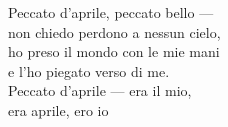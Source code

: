 \begin{lyrics}
Peccato d'aprile, peccato bello —\\
non chiedo perdono a nessun cielo,\\
ho preso il mondo con le mie mani\\
e l'ho piegato verso di me.\\
Peccato d'aprile — era il mio,\\
era aprile, ero io

\end{lyrics}

